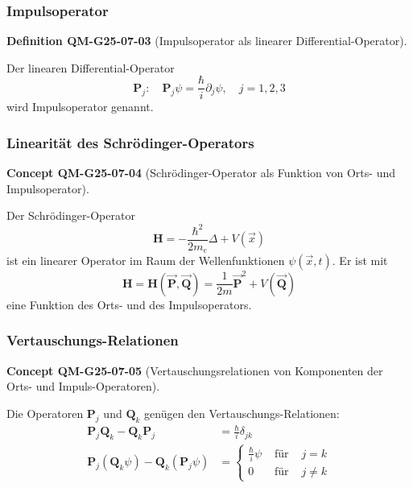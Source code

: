 \documentclass[10pt, letterpaper]{article}
\newcommand{\CustomHeading}[3]{%
  \par\medskip\noindent%
  \textbf{#1 #2} \textnormal{(#3)}.\enskip%
}
\newenvironment{DEF}[2]{\begin{unitbox}\CustomHeading{Definition}{#1}{#2}}{\end{unitbox}}
\newenvironment{CONC}[2]{\begin{unitbox}\CustomHeading{Concept}{#1}{#2}}{\end{unitbox}}
\begin{document}
\subsubsection*{Impulsoperator}


\begin{DEF}{QM-G25-07-03}{Impulsoperator als linearer Differential-Operator}
Der linearen Differential-Operator
$$
\mathbf{P}_{j}: \quad \mathbf{P}_{j} \psi=\frac{\hbar}{i} \partial_{j} \psi, \quad j=1,2,3
$$
wird Impulsoperator genannt.
\end{DEF}

\subsubsection*{Linearität des Schrödinger-Operators}


\begin{CONC}{QM-G25-07-04}{Schrödinger-Operator als Funktion von Orts- und Impulsoperator}
Der Schrödinger-Operator
$$
\mathbf{H}=-\frac{\hbar^{2}}{2 m_{e}} \Delta+V(\vec{x})
$$
ist ein linearer Operator im Raum der Wellenfunktionen $\psi(\vec{x}, t)$. Er ist mit
$$
\mathbf{H}=\mathbf{H}(\overrightarrow{\mathbf{P}}, \overrightarrow{\mathbf{Q}})=\frac{1}{2 m} \overrightarrow{\mathbf{P}}^{2}+V(\overrightarrow{\mathbf{Q}})
$$
eine Funktion des Orts- und des Impulsoperators.
\end{CONC}

\subsubsection*{Vertauschungs-Relationen}


\begin{CONC}{QM-G25-07-05}{Vertauschungsrelationen von Komponenten der Orts- und Impuls-Operatoren}
Die Operatoren $\mathbf{P}_{j}$ und $\mathbf{Q}_{k}$ genügen den Vertauschungs-Relationen:
$$
\begin{aligned}
\mathbf{P}_{j} \mathbf{Q}_{k}-\mathbf{Q}_{k} \mathbf{P}_{j} & =\frac{\hbar}{i} \delta_{j k} \\
\mathbf{P}_{j}\left(\mathbf{Q}_{k} \psi\right)-\mathbf{Q}_{k}\left(\mathbf{P}_{j} \psi\right) & =\left\{\begin{array}{rll}
\frac{\hbar}{i} \psi & \text { für } & j=k \\
0 & \text { für } & j \neq k
\end{array}\right.
\end{aligned}
$$
\end{CONC}
\end{document}
